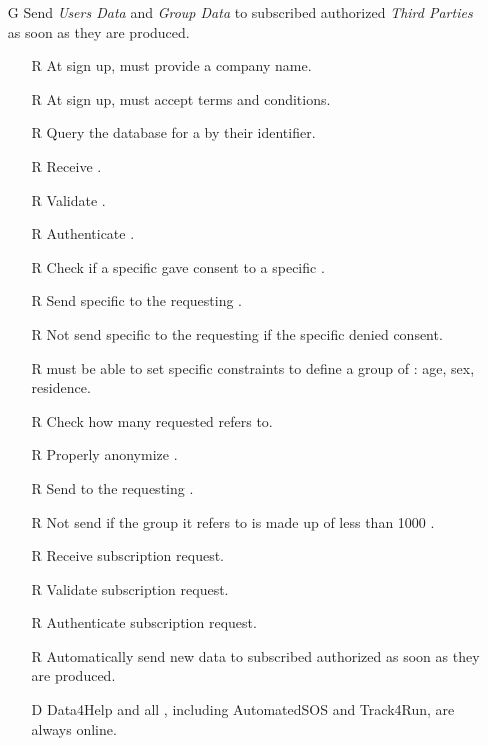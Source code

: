 \documentclass[../../../rasd.tex]{subfiles}
\begin{document}
\begin{itemize}
    \item[G\subs{4}]Send \textit{Users Data} and \textit{Group Data} to subscribed authorized \textit{Third Parties} as soon as they are produced.
    \begin{itemize}
            \item[R\subs{3}]At sign up,  must provide a company name.
            \item[R\subs{5}]At sign up,  must accept terms and conditions.
        \item[R\subs{7}]Query the database for a  by their identifier.
        \item[R\subs{8}]Receive .
        \item[R\subs{9}]Validate .
        \item[R\subs{10}]Authenticate .
        \item[R\subs{18}]Check if a specific  gave consent to a specific .
        \item[R\subs{19}]Send specific to the requesting .
        \item[R\subs{20}]Not send specific to the requesting  if the specific  denied consent.
        \item[R\subs{21}] must be able to set specific constraints to define a group of : age, sex, residence.
        \item[R\subs{22}]Check how many  requested  refers to.
        \item[R\subs{23}]Properly anonymize .
        \item[R\subs{24}]Send  to the requesting .
        \item[R\subs{25}]Not send  if the group it refers to is made up of less than 1000 .
        \item[R\subs{26}]Receive  subscription request.
        \item[R\subs{27}]Validate  subscription request.
        \item[R\subs{28}]Authenticate  subscription request.
        \item[R\subs{29}]Automatically send new data to subscribed authorized  as soon as they are produced.
        \\
        \item[D\subs{9}]Data4Help and all , including AutomatedSOS and Track4Run, are always online.

\end{itemize}
\end{itemize}
\end{document}
